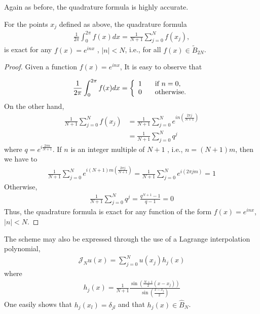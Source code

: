     \noindent Again as before, the quadrature formula is highly accurate. \\
    \begin{teor}
    \label{Exactness_Odd}	
    For the points $x_j$ defined as above, the quadrature formula
    \begin{align*}
         \frac{1}{2\pi}\displaystyle \int^{2\pi}_{0} f(x) dx = \frac{1}{N+1} \displaystyle \sum^{N}_{j=0} f(x_j),
    \end{align*}
    is exact for any $f(x) = e^{inx}$ , $|n| < N$, i.e., for all $f(x) \in \widetilde{B}_{2N}$.
    \begin{proof}
    	Given a function $f(x) = e^{in x}$, It is easy to observe that
    	
    	\begin{align*}
    		\frac{1}{2\pi}\displaystyle \int^{2\pi}_{0} f(x) dx =  \left \lbrace \begin{array}{ll}
    			1 \hspace{3mm} & \text{if } n = 0, \\
    			0 \hspace{3mm} & \text{otherwise.}
    		\end{array}  \right . 
    	\end{align*}
    	On the other hand,    
    	\begin{align*}
    		\frac{1}{N+1}  \displaystyle \sum_{j = 0}^{N} f(x_j) &= \frac{1}{N+1}  \displaystyle \sum_{j = 0}^{N} e^{in (\frac{2\pi j}{N+1})} \\
    		&= \frac{1}{N+1}  \displaystyle \sum_{j = 0}^{N} q^j
    	\end{align*}
    	where $q = e^{i \frac{2\pi n}{N+1}}$. If $n$ is an integer multiple of $N+1$ , i.e., $n = (N+1)m$, then we have to
    	\begin{align*}
    		\displaystyle \frac{1}{N+1} \sum^{N}_{j=0}  e^{i(N+1)m (\frac{2\pi j}{N+1})} = \frac{1}{N+1} \sum^{N}_{j=0}  e^{i (2\pi jm)} = 1
    	\end{align*}
    	 Otherwise, 
    	\begin{align*}
    		\displaystyle \frac{1}{N+1} \sum^{N}_{j=0} q^j = \frac{q^{N+1} - 1}{q - 1} = 0
    	\end{align*}
    	Thus, the quadrature formula is exact for any function of the form $f(x) = e^{inx}$, $|n| < N$.
    \end{proof}
    
    \end{teor}
    The scheme may also be expressed through the use of a Lagrange interpolation polynomial,
    \begin{align*}
    	\mathcal{J}_N u(x) =  \displaystyle \sum_{j=0}^{N} u(x_j) h_j (x)
	\end{align*}
	where
	\begin{align}
	    h_j (x) = \frac{1}{N + 1} \frac{\sin(\frac{N+1}{2}(x - x_j))}{\sin(\frac{x - x_j}{2})}
	\end{align}
    One easily shows that $h_j (x_l) = \delta_{jl}$ and that $h_j (x) \in \hat{B}_N $.

